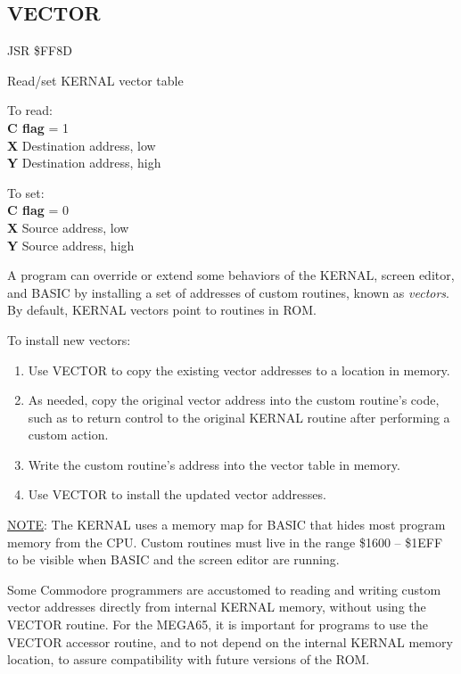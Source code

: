 \subsection{VECTOR}
\label{KERNAL Jump Table!VECTOR}
\begin{description}[leftmargin=2cm,style=nextline]
    \item [Address:] JSR \$FF8D
    \item [Description:] Read/set KERNAL vector table
    \item [Inputs:]
        To read: \\
        \textbf{C flag} = 1 \\
        \textbf{X} Destination address, low \\
        \textbf{Y} Destination address, high

        To set: \\
        \textbf{C flag} = 0 \\
        \textbf{X} Source address, low \\
        \textbf{Y} Source address, high

    \item [Remarks:]
        A program can override or extend some behaviors of the KERNAL, screen editor, and BASIC by installing a set of addresses of custom routines, known as \emph{vectors}. By default, KERNAL vectors point to routines in ROM.

        To install new vectors:

        \begin{enumerate}
            \item Use VECTOR to copy the existing vector addresses to a location in memory.
            \item As needed, copy the original vector address into the custom routine's code, such as to return control to the original KERNAL routine after performing a custom action.
            \item Write the custom routine's address into the vector table in memory.
            \item Use VECTOR to install the updated vector addresses.
        \end{enumerate}

        \underline{NOTE}: The KERNAL uses a memory map for BASIC that hides most program memory from the CPU. Custom routines must live in the range \$1600 -- \$1EFF to be visible when BASIC and the screen editor are running.

        Some Commodore programmers are accustomed to reading and writing custom vector addresses directly from internal KERNAL memory, without using the VECTOR routine. For the MEGA65, it is important for programs to use the VECTOR accessor routine, and to not depend on the internal KERNAL memory location, to assure compatibility with future versions of the ROM.


\end{description}
